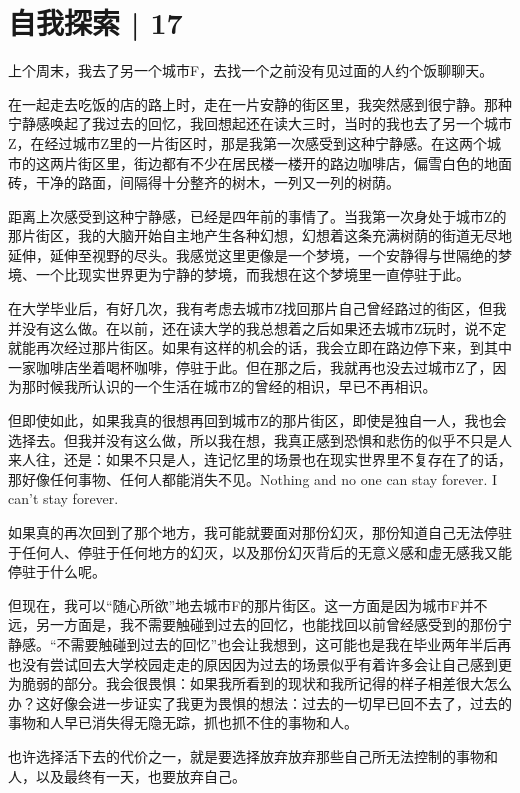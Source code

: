 \chapter{自我探索 | 17}



上个周末，我去了另一个城市F，去找一个之前没有见过面的人约个饭聊聊天。

在一起走去吃饭的店的路上时，走在一片安静的街区里，我突然感到很宁静。那种宁静感唤起了我过去的回忆，我回想起还在读大三时，当时的我也去了另一个城市Z，在经过城市Z里的一片街区时，那是我第一次感受到这种宁静感。在这两个城市的这两片街区里，街边都有不少在居民楼一楼开的路边咖啡店，偏雪白色的地面砖，干净的路面，间隔得十分整齐的树木，一列又一列的树荫。

距离上次感受到这种宁静感，已经是四年前的事情了。当我第一次身处于城市Z的那片街区，我的大脑开始自主地产生各种幻想，幻想着这条充满树荫的街道无尽地延伸，延伸至视野的尽头。我感觉这里更像是一个梦境，一个安静得与世隔绝的梦境、一个比现实世界更为宁静的梦境，而我想在这个梦境里一直停驻于此。

在大学毕业后，有好几次，我有考虑去城市Z找回那片自己曾经路过的街区，但我并没有这么做。在以前，还在读大学的我总想着之后如果还去城市Z玩时，说不定就能再次经过那片街区。如果有这样的机会的话，我会立即在路边停下来，到其中一家咖啡店坐着喝杯咖啡，停驻于此。但在那之后，我就再也没去过城市Z了，因为那时候我所认识的一个生活在城市Z的曾经的相识，早已不再相识。

但即使如此，如果我真的很想再回到城市Z的那片街区，即使是独自一人，我也会选择去。但我并没有这么做，所以我在想，我真正感到恐惧和悲伤的似乎不只是人来人往，还是：如果不只是人，连记忆里的场景也在现实世界里不复存在了的话，那好像任何事物、任何人都能消失不见。Nothing and no one can stay forever. I can't stay forever.

如果真的再次回到了那个地方，我可能就要面对那份幻灭，那份知道自己无法停驻于任何人、停驻于任何地方的幻灭，以及那份幻灭背后的无意义感和虚无感\pozhehao{}我又能停驻于什么呢。

\tristarsepline

但现在，我可以“随心所欲”地去城市F的那片街区。这一方面是因为城市F并不远，另一方面是，我不需要触碰到过去的回忆，也能找回以前曾经感受到的那份宁静感。“不需要触碰到过去的回忆”也会让我想到，这可能也是我在毕业两年半后再也没有尝试回去大学校园走走的原因\pozhehao{}因为过去的场景似乎有着许多会让自己感到更为脆弱的部分。我会很畏惧：如果我所看到的现状和我所记得的样子相差很大怎么办？这好像会进一步证实了我更为畏惧的想法：过去的一切早已回不去了，过去的事物和人早已消失得无隐无踪，抓也抓不住的事物和人。

也许选择活下去的代价之一，就是要选择放弃\pozhehao{}放弃那些自己所无法控制的事物和人，以及最终有一天，也要放弃自己。


